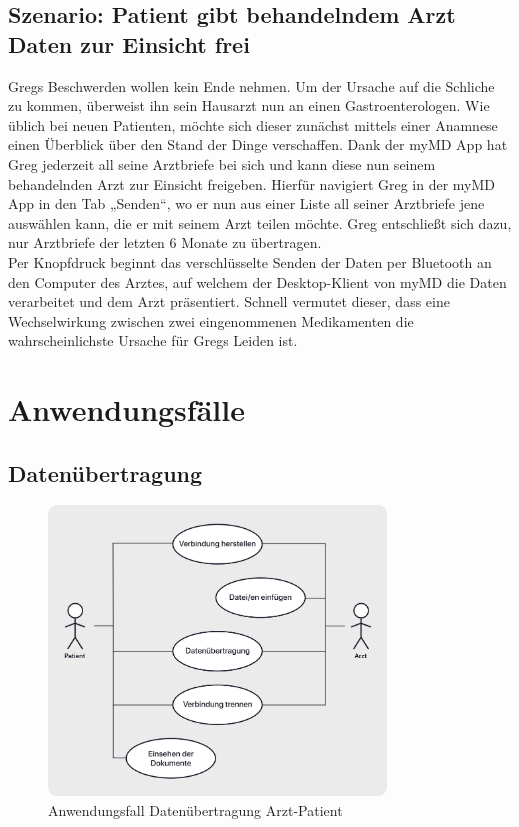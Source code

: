 \documentclass[a4paper]{scrreprt}
\begin{document}
\subsection{Szenario: Patient gibt behandelndem Arzt Daten zur Einsicht frei}
Gregs Beschwerden wollen kein Ende nehmen. Um der Ursache auf die Schliche zu kommen, überweist ihn sein Hausarzt nun an einen Gastroenterologen. Wie üblich bei neuen Patienten, möchte sich dieser zunächst mittels einer Anamnese einen Überblick über den Stand der Dinge verschaffen. Dank der myMD \gls{App} hat Greg jederzeit all seine Arztbriefe bei sich und kann diese nun seinem behandelnden Arzt zur Einsicht freigeben. Hierfür navigiert Greg in der myMD App in den Tab „Senden“, wo er nun aus einer Liste all seiner Arztbriefe jene auswählen kann, die er mit seinem Arzt teilen möchte. Greg entschließt sich dazu, nur Arztbriefe der letzten 6 Monate zu übertragen. \\
Per Knopfdruck beginnt das verschlüsselte Senden der Daten per \gls{Bluetooth} an den Computer des Arztes, auf welchem der Desktop-Klient von myMD die Daten verarbeitet und dem Arzt präsentiert. Schnell vermutet dieser, dass eine Wechselwirkung zwischen zwei eingenommenen Medikamenten die wahrscheinlichste Ursache für Gregs Leiden ist.

\section{Anwendungsfälle}
\subsection{Datenübertragung}
\begin{figure}[H]
\centering
\includegraphics[width=0.8\textwidth]{graphics/AF-ArztPatient}
\caption{Anwendungsfall Datenübertragung Arzt-Patient}
\end{figure}
\end{document}
